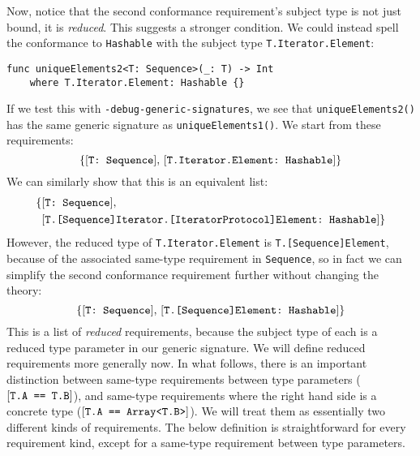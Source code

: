 \documentclass[../generics]{subfiles}
\begin{document}
Now, notice that the second conformance requirement's subject type is not just bound, it is \emph{reduced}. This suggests a stronger condition. We could instead spell the conformance to \texttt{Hashable} with the subject type \texttt{T.Iterator.Element}:
\begin{Verbatim}
func uniqueElements2<T: Sequence>(_: T) -> Int
    where T.Iterator.Element: Hashable {}
\end{Verbatim}
If we test this with \texttt{-debug-generic-signatures}, we see that \texttt{uniqueElements2()} has the same generic signature as \texttt{uniqueElements1()}. We start from these requirements:
\[\{[\texttt{T:~Sequence}],\,[\texttt{T.Iterator.Element:~Hashable}]\}\]
We can similarly show that this is an equivalent list:
\begin{align*}
\{&[\texttt{T:~Sequence}],\,\\
&[\texttt{T.[Sequence]Iterator.[IteratorProtocol]Element:~Hashable}]\}
\end{align*}
However, the reduced type of \texttt{T.Iterator.Element} is \texttt{T.[Sequence]Element}, because of the associated same-type requirement in \texttt{Sequence}, so in fact we can simplify the second conformance requirement further without changing the theory:
\[\{[\texttt{T:~Sequence}],\,[\texttt{T.[Sequence]Element:~Hashable}]\}\]
This is a list of \emph{reduced} requirements, because the subject type of each is a reduced type parameter in our generic signature. We will define reduced requirements more generally now. In what follows, there is an important distinction between same-type requirements between type parameters ($[\texttt{T.A == T.B}]$), and same-type requirements where the right hand side is a concrete type ($[\texttt{T.A == Array<T.B>}]$). We will treat them as essentially two different kinds of requirements. The below definition is straightforward for every requirement kind, except for a same-type requirement between type parameters. 
\end{document}
